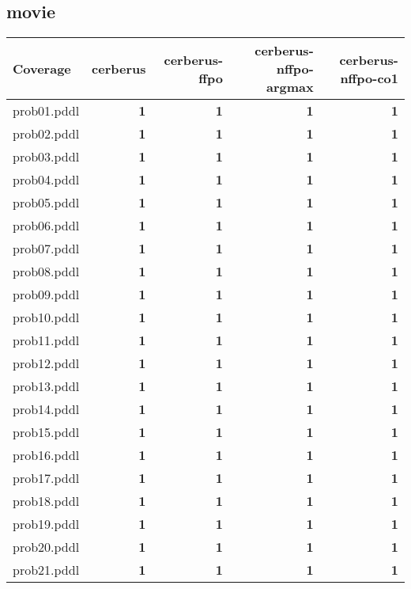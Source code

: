 \documentclass{article}
\begin{document}
\hypertarget{coverage-movie}{}
\subsection*{movie}

\begin{tabular}{@{}lrrrr@{}}
Coverage & cerberus & cerberus-ffpo & cerberus-nffpo-argmax & cerberus-nffpo-co1 \\
\midrule
prob01.pddl & \textbf{1} & \textbf{1} & \textbf{1} & \textbf{1} \\
prob02.pddl & \textbf{1} & \textbf{1} & \textbf{1} & \textbf{1} \\
prob03.pddl & \textbf{1} & \textbf{1} & \textbf{1} & \textbf{1} \\
prob04.pddl & \textbf{1} & \textbf{1} & \textbf{1} & \textbf{1} \\
prob05.pddl & \textbf{1} & \textbf{1} & \textbf{1} & \textbf{1} \\
prob06.pddl & \textbf{1} & \textbf{1} & \textbf{1} & \textbf{1} \\
prob07.pddl & \textbf{1} & \textbf{1} & \textbf{1} & \textbf{1} \\
prob08.pddl & \textbf{1} & \textbf{1} & \textbf{1} & \textbf{1} \\
prob09.pddl & \textbf{1} & \textbf{1} & \textbf{1} & \textbf{1} \\
prob10.pddl & \textbf{1} & \textbf{1} & \textbf{1} & \textbf{1} \\
prob11.pddl & \textbf{1} & \textbf{1} & \textbf{1} & \textbf{1} \\
prob12.pddl & \textbf{1} & \textbf{1} & \textbf{1} & \textbf{1} \\
prob13.pddl & \textbf{1} & \textbf{1} & \textbf{1} & \textbf{1} \\
prob14.pddl & \textbf{1} & \textbf{1} & \textbf{1} & \textbf{1} \\
prob15.pddl & \textbf{1} & \textbf{1} & \textbf{1} & \textbf{1} \\
prob16.pddl & \textbf{1} & \textbf{1} & \textbf{1} & \textbf{1} \\
prob17.pddl & \textbf{1} & \textbf{1} & \textbf{1} & \textbf{1} \\
prob18.pddl & \textbf{1} & \textbf{1} & \textbf{1} & \textbf{1} \\
prob19.pddl & \textbf{1} & \textbf{1} & \textbf{1} & \textbf{1} \\
prob20.pddl & \textbf{1} & \textbf{1} & \textbf{1} & \textbf{1} \\
prob21.pddl & \textbf{1} & \textbf{1} & \textbf{1} & \textbf{1} \\

\end{tabular}
\end{document}
